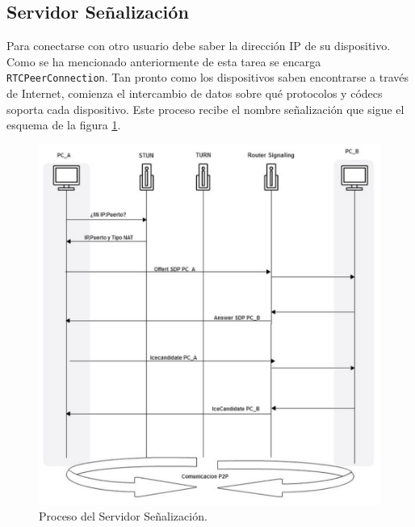 \subsection*{Servidor Señalización}
Para conectarse con otro usuario debe saber la dirección IP de su dispositivo. Como se ha mencionado anteriormente de esta tarea se encarga \texttt{RTCPeerConnection}. Tan pronto como los dispositivos saben encontrarse a través de Internet, comienza el intercambio de datos sobre qué protocolos y códecs soporta cada dispositivo. Este proceso recibe el nombre señalización que sigue el esquema de la figura \ref{fig:procesoSenalizacion}. 
\begin{figure}[!h]
\begin{center}
   \includegraphics[width=0.7\linewidth]{Figures/procesoSenalizacion}
  \decoRule
  \caption[Proceso del Servidor Señalización]{Proceso del Servidor Señalización.}
\label{fig:procesoSenalizacion}
\end{center}
\end{figure}

